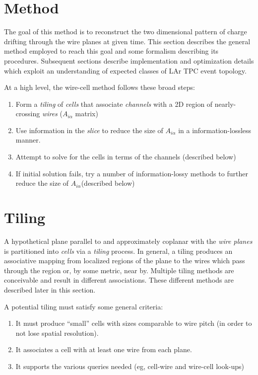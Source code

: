 \documentclass[letter]{article}
\def\mAchc{A_{i\alpha}}
\def\Achc{$\mAchc$\xspace}
\begin{document}
\section{Method}

The goal of this method is to reconstruct the two dimensional pattern
of charge drifting through the wire planes at given time.
This section describes the general method employed to reach
this goal and some formalism describing its procedures.
Subsequent sections describe implementation and optimization details
which exploit an understanding of expected classes of LAr TPC event topology.

At a high level, the wire-cell method follows these broad steps:

\begin{enumerate}
\item Form a \textit{tiling} of \textit{cells} that associate \textit{channels} with a 2D
  region of nearly-crossing \textit{wires} (\Achc matrix)
\item Use information in the \textit{slice} to reduce the size of
  \Achc in a information-lossless manner.
\item Attempt to solve for the cells in terms of the channels (described below)
\item If initial solution fails, try a number of information-lossy
  methods to further reduce the size of \Achc (described below)
\end{enumerate}

\section{Tiling}

A hypothetical plane parallel to and approximately coplanar with the
\textit{wire planes} is partitioned into \textit{cells} via a
\textit{tiling} process.
In general, a tiling produces an associative mapping from localized
regions of the plane to the wires which pass through the region or, by
some metric, near by.
Multiple tiling methods are conceivable and result in different
associations.
These different methods are described later in this section.

A potential tiling must satisfy some general criteria:

\begin{enumerate}
\item It must produce ``small'' cells with sizes comparable to wire pitch
   (in order to not lose spatial resolution).
 \item It associates a cell with at least one wire from each plane.
 \item It supports the various queries needed (eg, cell-wire and
    wire-cell look-ups)
\end{enumerate}
\end{document}
